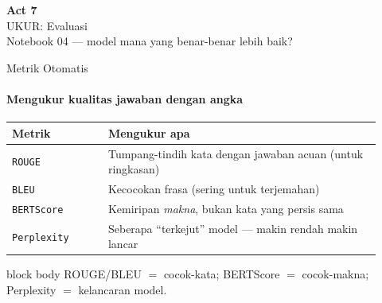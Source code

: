 \documentclass[aspectratio=169,t]{beamer}
\newcommand{\acttitle}[3]{%
  \begin{frame}[plain]
    \vspace{1.5cm}
    \begin{center}
      {\color{nvgreen}\Huge\bfseries Act #1}\\[1.2em]
      {\color{nvwhite}\Huge #2}\\[0.8em]
      {\color{nvgray}\Large #3}
    \end{center}
  \end{frame}%
}
\begin{document}
\acttitle{7}{UKUR: Evaluasi}{Notebook 04 --- model mana yang benar-benar lebih baik?}

\begin{frame}{Metrik Otomatis}
  \framesubtitle{Mengukur kualitas jawaban dengan angka}
  \begin{center}
  \renewcommand{\arraystretch}{1.3}
  {\footnotesize
  \setlength{\tabcolsep}{6pt}
  \begin{tabular}{@{}p{0.24\linewidth}p{0.68\linewidth}@{}}
    \toprule
    \rowcolor{nvcard!50}
    \textbf{Metrik} & \textbf{Mengukur apa} \\
    \midrule
    \texttt{ROUGE} & Tumpang-tindih kata dengan jawaban acuan (untuk ringkasan) \\
    \texttt{BLEU} & Kecocokan frasa (sering untuk terjemahan) \\
    \texttt{BERTScore} & Kemiripan \emph{makna}, bukan kata yang persis sama \\
    \texttt{Perplexity} & Seberapa ``terkejut'' model --- makin rendah makin lancar \\
    \bottomrule
  \end{tabular}%
  }
  \end{center}
  \vspace{0.5em}
  \begin{beamercolorbox}[rounded=true,shadow=false,sep=6pt]{block body}
    \centering\small\color{nvlightgreen}
    ROUGE/BLEU $=$ cocok-kata; BERTScore $=$ cocok-makna; Perplexity $=$ kelancaran model.
  \end{beamercolorbox}
\end{frame}
\end{document}
